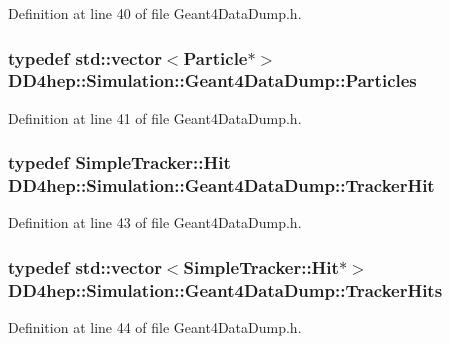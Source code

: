 Definition at line 40 of file Geant4DataDump.h.\hypertarget{class_d_d4hep_1_1_simulation_1_1_geant4_data_dump_a78b5910af0db1442a14600ae8dfc2a92}{
\subsubsection[{Particles}]{\setlength{\rightskip}{0pt plus 5cm}typedef std::vector$<${\bf Particle}$\ast$$>$ {\bf DD4hep::Simulation::Geant4DataDump::Particles}}}
\label{class_d_d4hep_1_1_simulation_1_1_geant4_data_dump_a78b5910af0db1442a14600ae8dfc2a92}


Definition at line 41 of file Geant4DataDump.h.\hypertarget{class_d_d4hep_1_1_simulation_1_1_geant4_data_dump_aaeea8b5b317a9a22e13f472200917ad2}{
\subsubsection[{TrackerHit}]{\setlength{\rightskip}{0pt plus 5cm}typedef {\bf SimpleTracker::Hit} {\bf DD4hep::Simulation::Geant4DataDump::TrackerHit}}}
\label{class_d_d4hep_1_1_simulation_1_1_geant4_data_dump_aaeea8b5b317a9a22e13f472200917ad2}


Definition at line 43 of file Geant4DataDump.h.\hypertarget{class_d_d4hep_1_1_simulation_1_1_geant4_data_dump_aa71f3341672792aa15c10e82cdbeca4b}{
\subsubsection[{TrackerHits}]{\setlength{\rightskip}{0pt plus 5cm}typedef std::vector$<${\bf SimpleTracker::Hit}$\ast$$>$ {\bf DD4hep::Simulation::Geant4DataDump::TrackerHits}}}
\label{class_d_d4hep_1_1_simulation_1_1_geant4_data_dump_aa71f3341672792aa15c10e82cdbeca4b}


Definition at line 44 of file Geant4DataDump.h.

